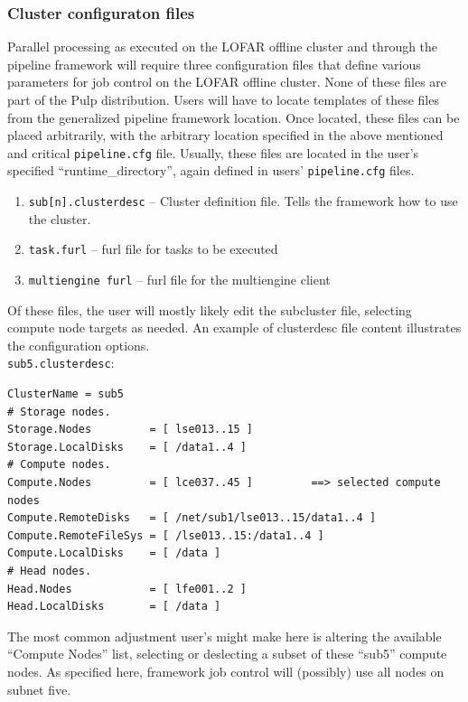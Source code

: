 \documentclass[a4paper,10pt,bibtotoc]{scrartcl}
\begin{document}
\subsubsection{Cluster configuraton files}
Parallel processing as executed on the LOFAR offline cluster and through the pipeline framework will require three configuration files that define various parameters for job control on the LOFAR offline cluster.  None of these files are part of the Pulp distribution.  Users will have to locate templates of these files from the generalized pipeline framework location.  Once located, these files can be placed arbitrarily, with the arbitrary location specified in the above mentioned and critical \verb|pipeline.cfg| file.  Usually, these files are located in the user's specified ``runtime\_directory'', again defined in users' \verb|pipeline.cfg| files.
\begin{enumerate}
\item \verb|sub[n].clusterdesc| -- Cluster definition file.  Tells the framework how to use the cluster.
\item \verb|task.furl| -- furl file for tasks to be executed
\item \verb|multiengine furl| -- furl file for the multiengine client
\end{enumerate}
Of these files, the user will mostly likely edit the subcluster file, selecting compute node targets as needed.  An example of clusterdesc file content illustrates the configuration options.\\
\verb|sub5.clusterdesc|:
\begin{verbatim}
ClusterName = sub5 
# Storage nodes. 
Storage.Nodes         = [ lse013..15 ] 
Storage.LocalDisks    = [ /data1..4 ] 
# Compute nodes. 
Compute.Nodes         = [ lce037..45 ]         ==> selected compute nodes
Compute.RemoteDisks   = [ /net/sub1/lse013..15/data1..4 ] 
Compute.RemoteFileSys = [ /lse013..15:/data1..4 ] 
Compute.LocalDisks    = [ /data ] 
# Head nodes. 
Head.Nodes            = [ lfe001..2 ] 
Head.LocalDisks       = [ /data ]
\end{verbatim}
The most common adjustment user's might make here is altering the available ``Compute Nodes'' list, selecting or deslecting a subset of these ``sub5'' compute nodes.  As specified here, framework job control will (possibly) use all nodes on subnet five.


\end{document}
